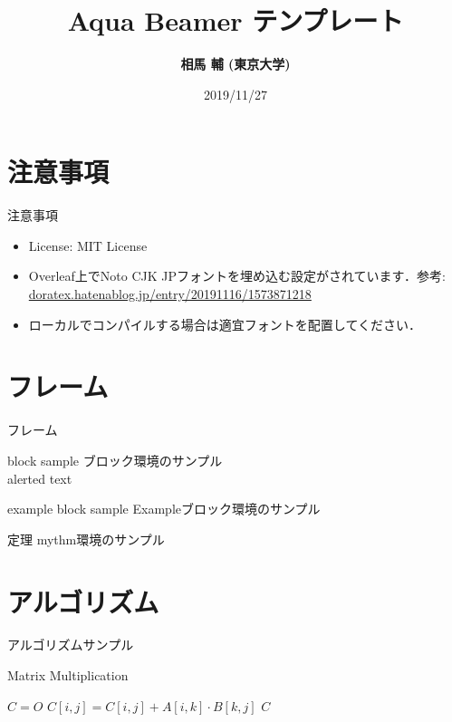 \documentclass[14pt,xcolor=dvipsnames,table,dvipdfmx]{beamer}
\title{Aqua Beamer テンプレート}
\author{\textbf{相馬 輔 (東京大学)}}
\date{2019/11/27}
\institute{ほげほげ研究室}
\theoremstyle{definition}
\newenvironment{mythm}{\begin{alertblock}{定理}}{\end{alertblock}} %
\begin{document}
\maketitle
\frame{\tableofcontents[hideallsubsections]}

\section{注意事項}
\begin{frame}{注意事項}
\begin{itemize}
\item License: MIT License
\item Overleaf上でNoto CJK JPフォントを埋め込む設定がされています．参考: \url{doratex.hatenablog.jp/entry/20191116/1573871218}
\item ローカルでコンパイルする場合は適宜フォントを配置してください．
\end{itemize}
\end{frame}

\section{フレーム}
\begin{frame}{フレーム}
    \begin{block}{block sample}
        ブロック環境のサンプル\\
        \alert{alerted text}
    \end{block} 
    \vfill
    \begin{exampleblock}{example block sample}
        Exampleブロック環境のサンプル
    \end{exampleblock} 
    \vfill
    \begin{mythm}
        mythm環境のサンプル
    \end{mythm} 
\end{frame}

\section{アルゴリズム}
\begin{frame}{アルゴリズムサンプル}
    \begin{block}{Matrix Multiplication}
        \begin{algorithmic}[1]
            \STATE $C = O$
            \STATE $C[i,j] = C[i,j] + A[i, k] \cdot B[k, j]$
            \ENDFOR
            \ENDFOR
            \ENDFOR
            \RETURN $C$
        \end{algorithmic}
    \end{block}
\end{frame}
\end{document}
